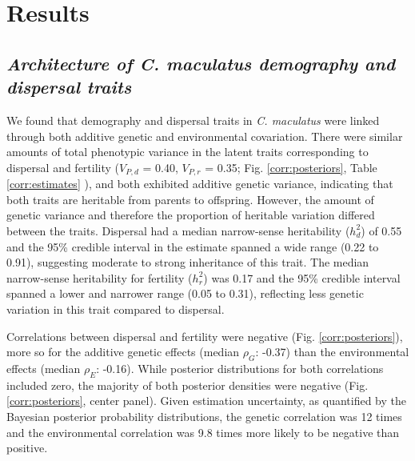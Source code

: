 \documentclass[11pt]{article}
\newcommand{\tom}[1]{{\textit{\color{WildStrawberry}{[#1]}}}}
\begin{document}
\section*{Results}

\subsection*{\textit{Architecture of \textup{C. maculatus} demography and dispersal traits}}
We found that demography and dispersal traits in \textit{C. maculatus} were linked through both additive genetic and environmental covariation.
There were similar amounts of total phenotypic variance in the latent traits corresponding to dispersal and fertility ($V_{P,d}$  = 0.40, $V_{P,r}$  = 0.35; Fig. \ref{corr:posteriors}, Table \ref{corr:estimates}
), and both exhibited additive genetic variance, indicating that both traits are heritable from parents to offspring.
However, the  amount of genetic variance and therefore the proportion of heritable variation differed between the traits.
Dispersal had a median narrow-sense heritability ($h^{2}_{d}$) of 0.55 and the 95\% credible interval in the estimate spanned a wide range (0.22 to 0.91), suggesting moderate to strong inheritance of this trait.
The median narrow-sense heritability for fertility ($h^{2}_{r}$) was 0.17 and the 95\% credible interval spanned a lower and narrower range (0.05 to 0.31), reflecting less genetic variation in this trait compared to dispersal.

Correlations between dispersal and fertility were negative (Fig. \ref{corr:posteriors}), more so for the additive genetic effects (median $\rho_{G}$: -0.37) than the environmental effects (median $\rho_{E}$: -0.16).
While posterior distributions for both correlations included zero, the majority of both posterior densities were negative (Fig. \ref{corr:posteriors}, center panel).
Given estimation uncertainty, as quantified by the Bayesian posterior probability distributions, the genetic correlation was 12 times and the environmental correlation was 9.8 times more likely to be negative than positive.
\end{document}
